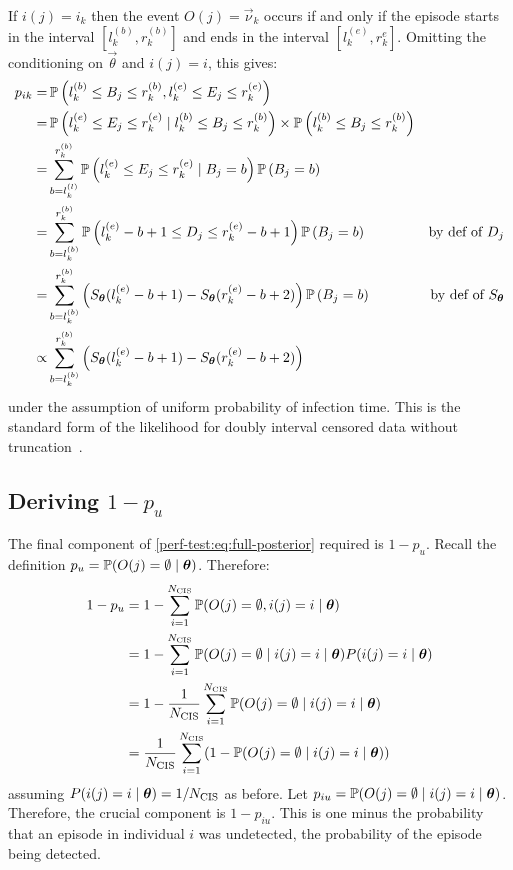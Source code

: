 \documentclass[thesis.tex]{subfiles}
\begin{document}
If $i(j) = i_k$ then the event $O(j) = \vec{\nu}_k$ occurs if and only if the episode starts in the interval $[l^{(b)}_k, r^{(b)}_k]$ and ends in the interval $[l^{(e)}_k, r^{e}_k]$.
Omitting the conditioning on $\vec{\theta}$ and $i(j) = i$, this gives:
\begin{align}
p_{ik}
=& \operatorname{\mathbb{P}} \left( l_k^{(b)} \leq B_{j} \leq r_k^{(b)}, l_k^{(e)} \leq E_{j} \leq r_k^{(e)} \right) \\
=& \operatorname{\mathbb{P}} \left( l_k^{(e)} \leq E_{j} \leq r_k^{(e)} \mid l_k^{(b)} \leq B_{j} \leq r_k^{(b)} \right) \times\operatorname{\mathbb{P}} \left( l_k^{(b)} \leq B_{j} \leq r_k^{(b)} \right) \\
=& \sum_{b = l_k^{(l)}}^{r_k^{(b)}} \operatorname{\mathbb{P}} \left( l_k^{(e)} \leq E_{j} \leq r_k^{(e)} \mid B_{j} = b \right) \operatorname{\mathbb{P}} \left(B_{j} = b \right) \\
=& \sum_{b = l_k^{(b)}}^{r_k^{(b)}} \operatorname{\mathbb{P}} \left( l_k^{(e)} - b + 1 \leq D_{j} \leq r_k^{(e)} - b + 1 \right) \operatorname{\mathbb{P}} \left(B_{j} = b \right) &\text{by def of $D_{j}$} \\
=& \sum_{b = l_k^{(b)}}^{r_k^{(b)}} \left( S_{\bm{\theta}}(l_k^{(e)} - b + 1) - S_{\bm{\theta}}(r_k^{(e)} - b + 2) \right) \operatorname{\mathbb{P}} \left(B_{j} = b \right) &\text{by def of $S_{\bm{\theta}}$} \\
\propto& \sum_{b = l_k^{(b)}}^{r_k^{(b)}} \left( S_{\bm{\theta}}(l_k^{(e)} - b + 1) - S_{\bm{\theta}}(r_k^{(e)} - b + 2) \right)
\label{perf-test:eq:pia}
\end{align}
under the assumption of uniform probability of infection time.
This is the standard form of the likelihood for doubly interval censored data without truncation~\autocite[e.g.][]{sunEmpirical}.

\subsection{Deriving $1 - p_u$} \label{perf-test:sec:prob-undetected}

The final component of \cref{perf-test:eq:full-posterior} required is $1 - p_u$.
Recall the definition $p_u = \operatorname{\mathbb{P}}(O(j) = \emptyset \mid \bm{\theta})$.
Therefore:
\begin{align}
  1 - p_u
  &= 1 - \sum_{i=1}^{N_\text{CIS}} \operatorname{\mathbb{P}}(O(j) = \emptyset, i(j) = i \mid \bm{\theta}) \\
  &= 1 - \sum_{i=1}^{N_\text{CIS}} \operatorname{\mathbb{P}}(O(j) = \emptyset \mid i(j) = i \mid \bm{\theta}) P(i(j) = i \mid \bm{\theta}) \\
  &= 1 - \frac{1}{N_\text{CIS}}\sum_{i=1}^{N_\text{CIS}} \operatorname{\mathbb{P}}(O(j) = \emptyset \mid i(j) = i \mid \bm{\theta}) \\
  &= \frac{1}{N_\text{CIS}} \sum_{i=1}^{N_\text{CIS}} (1 - \operatorname{\mathbb{P}}(O(j) = \emptyset \mid i(j) = i \mid \bm{\theta}))
  \label{perf-test:eq:pu}
\end{align}
assuming $P(i(j) = i \mid \bm{\theta}) = 1/N_\text{CIS}$ as before.
Let $p_{iu} = \operatorname{\mathbb{P}}(O(j) = \emptyset \mid i(j) = i \mid \bm{\theta})$.
Therefore, the crucial component is $1 - p_{iu}$.
This is one minus the probability that an episode in individual $i$ was undetected, \ie the probability of the episode being detected.
\end{document}
